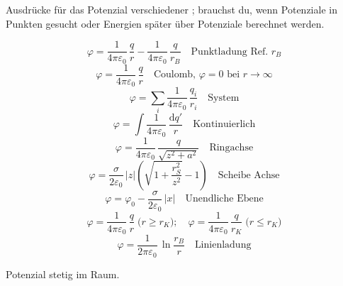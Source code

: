 \begin{runintext}
Ausdrücke für das Potenzial verschiedener ; brauchst du, wenn Potenziale in Punkten gesucht oder Energien später über Potenziale berechnet werden.
\end{runintext}
\begin{formulabox}
\[ \varphi = \frac{1}{4\pi\varepsilon_0}\,\frac{q}{r} - \frac{1}{4\pi\varepsilon_0}\,\frac{q}{r_B} \quad \text{Punktladung Ref.\ $r_B$} \]
\[ \varphi = \frac{1}{4\pi\varepsilon_0}\,\frac{q}{r} \quad \text{Coulomb, $\varphi=0$ bei $r\to\infty$} \]
\formulasep
\[ \varphi = \sum_i \frac{1}{4\pi\varepsilon_0}\,\frac{q_i}{r_i} \quad \text{System} \]
\[ \varphi = \int \frac{1}{4\pi\varepsilon_0}\,\frac{\mathrm{d}q'}{r} \quad \text{Kontinuierlich} \]
\formulasep
\[ \varphi = \frac{1}{4\pi\varepsilon_0}\,\frac{q}{\sqrt{z^2+a^2}} \quad \text{Ringachse} \]
\formulasep
\[ \varphi = \frac{\sigma}{2\varepsilon_0}\,|z|\left(\sqrt{1+\frac{r_S^2}{z^2}}-1\right) \quad \text{Scheibe Achse} \]
\formulasep
\[ \varphi = \varphi_0 - \frac{\sigma}{2\varepsilon_0}\,|x| \quad \text{Unendliche Ebene} \]
\formulasep
\[ \varphi = \dfrac{1}{4\pi\varepsilon_0}\,\dfrac{q}{r}\;\text{($r\ge r_K$)}; \quad \varphi = \dfrac{1}{4\pi\varepsilon_0}\,\dfrac{q}{r_K}\;\text{($r\le r_K$)} \]
\formulasep
\[ \varphi = \frac{1}{2\pi\varepsilon_0}\,\ln\frac{r_B}{r} \quad \text{Linienladung} \]
\end{formulabox}
\begin{runintext}
Potenzial stetig im Raum.
\end{runintext}

